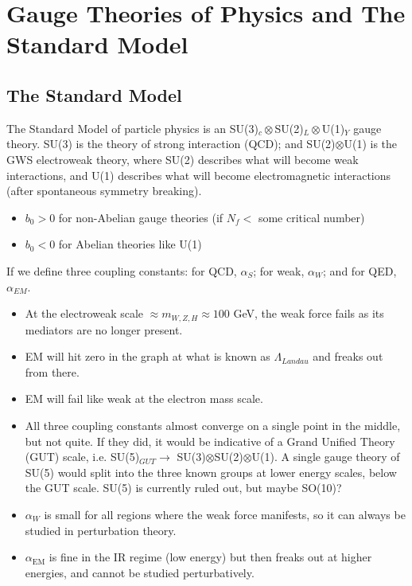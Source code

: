 \documentclass[a4paper, 11pt, normalem]{report}
\begin{document}
\chapter{Gauge Theories of Physics and The Standard Model}
\section{The Standard Model}
The Standard Model of particle physics is an SU(3)$_c\otimes$SU(2)$_L\otimes$U(1)$_Y$ gauge theory.
SU(3) is the theory of strong interaction (QCD); and SU(2)$\otimes$U(1) is the GWS electroweak theory, where SU(2) describes what will become weak interactions, and U(1) describes what will become electromagnetic interactions (after spontaneous symmetry breaking).
\begin{itemize}
    \item $b_0>0$ for non-Abelian gauge theories (if $N_f <$ some critical number)
    \item $b_0<0$ for Abelian theories like U(1)
\end{itemize}
If we define three coupling constants: for QCD, $\alpha_S$; for weak, $\alpha_W$; and for QED, $\alpha_{EM}$.
\begin{figure}[H]
    \centering
\end{figure}
\begin{itemize}
    \item At the electroweak scale $\approx m_{W,Z,H}\approx100$ GeV, the weak force fails as its mediators are no longer present.
    \item EM will hit zero in the graph at what is known as $\Lambda_{Landau}$ and freaks out from there.
    \item EM will fail like weak at the electron mass scale.
    \item All three coupling constants almost converge on a single point in the middle, but not quite.
        If they did, it would be indicative of a Grand Unified Theory (GUT) scale, i.e. SU(5)$_{GUT}\to$ SU(3)$\otimes$SU(2)$\otimes$U(1).
        A single gauge theory of SU(5) would split into the three known groups at lower energy scales, below the GUT scale.
        SU(5) is currently ruled out, but maybe SO(10)?
    \item $\alpha_W$ is small for all regions where the weak force manifests, so it can always be studied in perturbation theory.
    \item $\alpha_{\text{EM}}$ is fine in the IR regime (low energy) but then freaks out at higher energies, and cannot be studied perturbatively.
\end{itemize}
\end{document}

